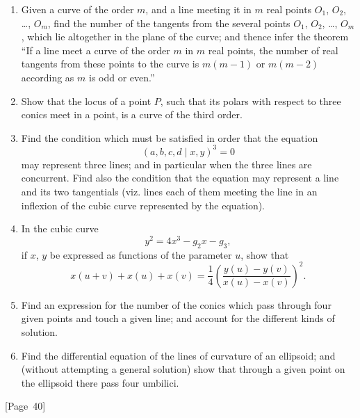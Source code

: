 \documentclass[11pt,a4paper]{book}
\begin{document}
\begin{enumerate}
\item Given a curve of the order $m$, and a line meeting it in $m$ real
points $O_1$, $O_2$, \dots, $O_m$, find the number of the tangents from
the several points $O_1$, $O_2$, \dots, $O_m$, which lie altogether in the
plane of the curve; and thence infer the theorem ``If a line meet a
curve of the order $m$ in $m$ real points, the number of real tangents
from these points to the curve is $m(m-1)$ or $m(m-2)$ according as $m$
is odd or even.''

\item Show that the locus of a point $P$, such that its polars with
respect to three conics meet in a point, is a curve of the third order.

\item Find the condition which must be satisfied in order that the equation
\[
(a,b,c,d\mid x,y)^3 = 0
\]
may represent three lines; and in particular when the three lines are
concurrent. Find also the condition that the equation may represent a
line and its two tangentials (viz. lines each of them meeting the line
in an inflexion of the cubic curve represented by the equation).

\item In the cubic curve
\[
y^2 = 4x^3 - g_2x - g_3,
\]
if $x$, $y$ be expressed as functions of the parameter $u$, show that
\[
x(u+v) + x(u) + x(v) = \frac{1}{4}\left(
\frac{y(u) - y(v)}{x(u) - x(v)} \right)^2.
\]

\item Find an expression for the number of the conics which pass through
four given points and touch a given line; and account for the different
kinds of solution.

\item Find the differential equation of the lines of curvature of an
ellipsoid; and (without attempting a general solution) show that through
a given point on the ellipsoid there pass four umbilici.
\end{enumerate}

\begin{center}
[Page~40]
\end{center}
\end{document}
